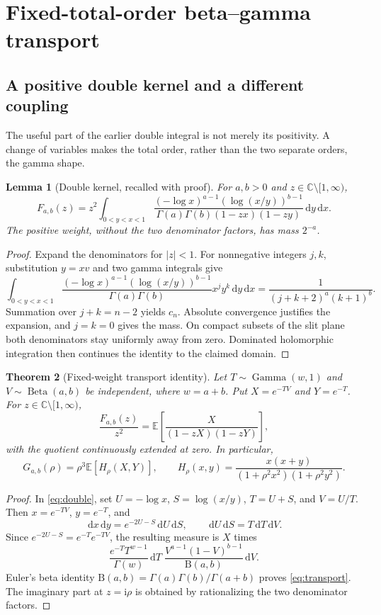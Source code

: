 \documentclass[11pt]{article}
\numberwithin{equation}{section}
\newtheorem{theorem}{Theorem}[section]
\newtheorem{lemma}[theorem]{Lemma}
\theoremstyle{definition}\newtheorem{definition}[theorem]{Definition}
\theoremstyle{remark}\newtheorem{remark}[theorem]{Remark}
\newcommand{\dd}{\,\mathrm d}
\newcommand{\ii}{\mathrm i}
\newcommand{\C}{\mathbb C}
\newcommand{\E}{\mathbb E}
\newcommand{\cut}{\C\setminus[1,\infty)}
\DeclareMathOperator{\Beta}{Beta}
\DeclareMathOperator{\GammaLaw}{Gamma}
\begin{document}
\section{Fixed-total-order beta--gamma transport}
\label{sec:transport}
\subsection{A positive double kernel and a different coupling}
The useful part of the earlier double integral is not merely its positivity.
A change of variables makes the total order, rather than the two separate
orders, the gamma shape.

\begin{lemma}[Double kernel, recalled with proof]\label{lem:double}
For $a,b>0$ and $z\in\cut$,
\begin{equation}\label{eq:double}
 F_{a,b}(z)=z^2\int_{0<y<x<1}
 \frac{(-\log x)^{a-1}(\log(x/y))^{b-1}}
 {\Gamma(a)\Gamma(b)(1-zx)(1-zy)}\dd y\dd x.
\end{equation}
The positive weight, without the two denominator factors, has mass $2^{-a}$.
\end{lemma}
\begin{proof}
Expand the denominators for $|z|<1$. For nonnegative integers $j,k$,
substitution $y=xv$ and two gamma integrals give
\[
 \int_{0<y<x<1}
 \frac{(-\log x)^{a-1}(\log(x/y))^{b-1}}
 {\Gamma(a)\Gamma(b)}x^jy^k\dd y\dd x
 =\frac1{(j+k+2)^a(k+1)^b}.
\]
Summation over $j+k=n-2$ yields $c_n$. Absolute convergence justifies the
expansion, and $j=k=0$ gives the mass. On compact subsets of the slit plane
both denominators stay uniformly away from zero. Dominated holomorphic
integration then continues the identity to the claimed domain.
\end{proof}

\begin{theorem}[Fixed-weight transport identity]\label{thm:transport}
Let $T\sim\GammaLaw(w,1)$ and $V\sim\Beta(a,b)$ be independent, where
$w=a+b$. Put $X=e^{-TV}$ and $Y=e^{-T}$. For $z\in\cut$,
\begin{equation}\label{eq:transport}
 \frac{F_{a,b}(z)}{z^2}
 =\E\left[\frac{X}{(1-zX)(1-zY)}\right],
\end{equation}
with the quotient continuously extended at zero. In particular,
\begin{equation}\label{eq:Gtransport}
 G_{a,b}(\rho)=\rho^3\E[H_\rho(X,Y)],\qquad
 H_\rho(x,y)=\frac{x(x+y)}{(1+\rho^2x^2)(1+\rho^2y^2)}.
\end{equation}
\end{theorem}
\begin{proof}
In \eqref{eq:double}, set $U=-\log x$, $S=\log(x/y)$,
$T=U+S$, and $V=U/T$. Then $x=e^{-TV}$, $y=e^{-T}$, and
\[
 \dd x\dd y=e^{-2U-S}\dd U\dd S,
 \qquad \dd U\dd S=T\dd T\dd V.
\]
Since $e^{-2U-S}=e^{-T}e^{-TV}$, the resulting measure is $X$ times
\[
 \frac{e^{-T}T^{w-1}}{\Gamma(w)}\dd T\;
 \frac{V^{a-1}(1-V)^{b-1}}{\mathrm B(a,b)}\dd V.
\]
Euler's beta identity $\mathrm B(a,b)=\Gamma(a)\Gamma(b)/\Gamma(a+b)$
\cite{dlmf-beta} proves \eqref{eq:transport}. The imaginary part at
$z=\ii\rho$ is obtained by rationalizing the two denominator factors.
\end{proof}
\end{document}
